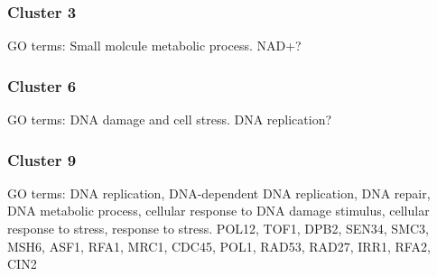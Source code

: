 \documentclass[]{article}
\begin{document}
\subsubsection{Cluster 3}
GO terms: Small molcule metabolic process.
NAD+?

\subsubsection{Cluster 6}
GO terms: DNA damage and cell stress. DNA replication?

\subsubsection{Cluster 9}
GO terms: DNA replication, DNA-dependent DNA replication, DNA repair, DNA metabolic process, cellular response to DNA damage stimulus, cellular response to stress, response to stress. 
POL12, TOF1, DPB2, SEN34, SMC3, MSH6, ASF1, RFA1, MRC1, CDC45, POL1, RAD53, RAD27, IRR1, RFA2, CIN2
\end{document}
